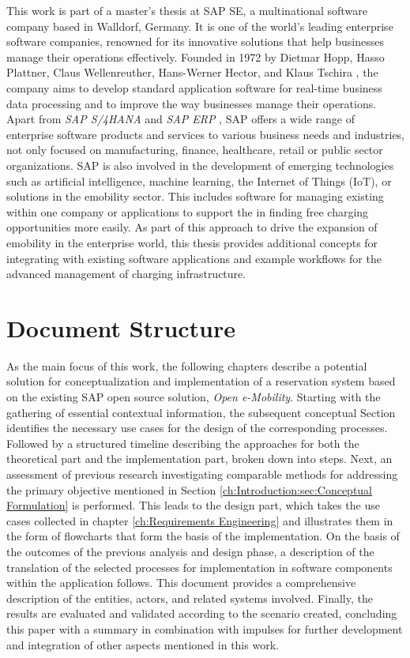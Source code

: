 This work is part of a master's thesis at SAP SE, a multinational software company based in Walldorf, Germany. 
It is one of the world's leading enterprise software companies, renowned for its innovative solutions that help businesses manage their operations effectively. 
Founded in 1972 by Dietmar Hopp, Hasso Plattner, Claus Wellenreuther, Hans-Werner Hector, and Klaus Tschira \cite{noauthor_inventing_nodate}, the company aims to develop standard application software for real-time business data processing and to improve the way businesses manage their operations. 
Apart from \textit{SAP S/4HANA} and \textit{SAP ERP} \cite{noauthor_sap_nodate}, SAP offers a wide range of enterprise software products and services to various business needs and industries, not only focused on manufacturing, finance, healthcare, retail or public sector organizations.
SAP is also involved in the development of emerging technologies such as artificial intelligence, machine learning, the Internet of Things (IoT), or solutions in the \acrshort{emobility} sector.
This includes software for managing existing  within one company or applications to support the  in finding free charging opportunities more easily. 
As part of this approach to drive the expansion of \acrshort{emobility} in the enterprise world, this thesis provides additional concepts for integrating with existing software applications and example workflows for the advanced management of charging infrastructure. 

\newpage

\section{Document Structure}
\label{ch:Introduction:Document Structure}

As the main focus of this work, the following chapters describe a potential solution for conceptualization and implementation of a reservation system based on the existing SAP open source solution, \textit{Open e-Mobility}. 
Starting with the gathering of essential contextual information, the subsequent conceptual Section identifies the necessary use cases for the design of the corresponding processes. 
Followed by a structured timeline describing the approaches for both the theoretical part and the implementation part, broken down into steps. 
Next, an assessment of previous research investigating comparable methods for addressing the primary objective mentioned in Section \ref{ch:Introduction:sec:Conceptual Formulation} is performed.
This leads to the design part, which takes the use cases collected in chapter \ref{ch:Requirements Engineering} and illustrates them in the form of flowcharts that form the basis of the implementation. 
On the basis of the outcomes of the previous analysis and design phase, a description of the translation of the selected processes for implementation in software components within the application follows. This document provides a comprehensive description of the entities, actors, and related systems involved.
Finally, the results are evaluated and validated according to the scenario created, concluding this paper with a summary in combination with impulses for further development and integration of other aspects mentioned in this work.